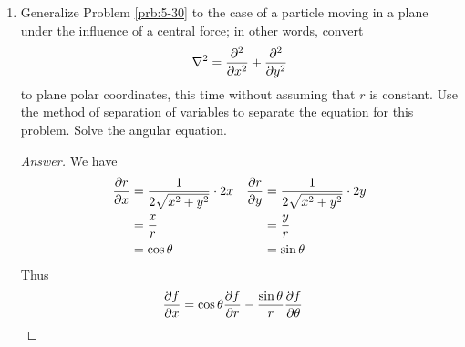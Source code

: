 \documentclass[../notes.tex]{subfiles}
\begin{document}
\begin{enumerate}[label={\textbf{5-\arabic*.}},ref={5-\arabic*}]
\begin{proof}[Answer]
\begin{align*}
        \end{align*}
        as desired.\par
        The rest of the differential equation derivations follow fairly easy with simple calculus rules.\par
        As for the Schr\"{o}dinger equation, we know that there is no potential field for this particle. Additionally, although we could choose to express $\psi$ as a function of $x,y$, owing to the radial symmetry, we choose to express it as a function of $r,\theta$. In fact, we need only express $\psi$ as a function of $\theta$ since $r$ is invariant throughout the chosen free space. Thus, expanding from the general form, we get
        \begin{align*}
            \hat{H}\psi(\theta) &= E\psi(\theta)\\
            \left( -\frac{\hbar^2}{2m}\nabla^2 \right)\psi(\theta) &= E\psi(\theta)\\
            -\frac{\hbar^2}{2m}\cdot\frac{1}{r^2}\left( \pdv[2]{\psi(\theta)}{\theta} \right)_r &= E\psi(\theta)\\
            -\frac{\hbar^2}{2I}\pdv[2]{\psi(\theta)}{\theta} &= E\psi(\theta)
        \end{align*}
        as desired.
    \end{proof}
    \item \label{prb:5-31}Generalize Problem \ref{prb:5-30} to the case of a particle moving in a plane under the influence of a central force; in other words, convert
    \begin{equation*}
        \nabla^2 = \pdv[2]{x}+\pdv[2]{y}
    \end{equation*}
    to plane polar coordinates, this time without assuming that $r$ is constant. Use the method of separation of variables to separate the equation for this problem. Solve the angular equation.
    \begin{proof}[Answer]
        We have
        \begin{align*}
            \pdv{r}{x} &= \frac{1}{2\sqrt{x^2+y^2}}\cdot 2x&
                \pdv{r}{y} &= \frac{1}{2\sqrt{x^2+y^2}}\cdot 2y\\
            &= \frac{x}{r}&
                &= \frac{y}{r}\\
            &= \cos\theta&
                &= \sin\theta
        \end{align*}
        Thus
        \begin{align*}
            \pdv{f}{x} &= \cos\theta\pdv{f}{r}-\frac{\sin\theta}{r}\pdv{f}{\theta}&

\end{align*}
\end{proof}
\end{enumerate}
\end{document}

